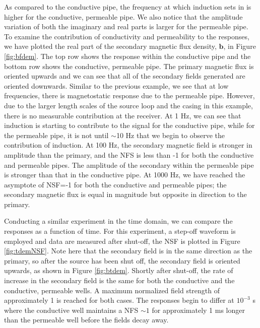 As compared to the conductive pipe, the frequency at which induction sets in is higher for the conductive, permeable pipe. We also notice that the amplitude variation of both the imaginary and real parts is larger for the permeable pipe. To examine the contribution of conductivity and permeability to the responses, we have plotted the real part of the secondary magnetic flux density, $\mathbf{b}$, in Figure \ref{fig:bfdem}. The top row shows the response within the conductive pipe and the bottom row shows the conductive, permeable pipe. The primary magnetic flux is oriented upwards and we can see that all of the secondary fields generated are oriented downwards. Similar to the previous example, we see that at low frequencies, there is magnetostatic response due to the permeable pipe. However, due to the larger length scales of the source loop and the casing in this example, there is no measurable contribution at the receiver. At 1 Hz, we can see that induction is starting to contribute to the signal for the conductive pipe, while for the permeable pipe, it is not until $\sim$10 Hz that we begin to observe the contribution of induction. At 100 Hz, the secondary magnetic field is stronger in amplitude than the primary, and the NFS is less than -1 for both the conductive and permeable pipes. The amplitude of the secondary within the permeable pipe is stronger than that in the conductive pipe. At 1000 Hz, we have reached the asymptote of NSF=-1 for both the conductive and permeable pipes; the secondary magnetic flux is equal in magnitude but opposite in direction to the primary.







Conducting a similar experiment in the time domain, we can compare the responses as a function of time. For this experiment, a step-off waveform is employed and data are measured after shut-off, the NSF is plotted in Figure \ref{fig:tdemNSF}. Note here that the secondary field is in the same direction as the primary, so after the source has been shut off, the secondary field is oriented upwards, as shown in Figure \ref{fig:btdem}. Shortly after shut-off, the rate of increase in the secondary field is the same for both the conductive and the conductive, permeable wells. A maximum normalized field strength of approximately 1 is reached for both cases. The responses begin to differ at $10^{-3}$ s where the conductive well maintains a NFS $\sim 1$ for approximately 1 ms longer than the permeable well before the fields decay away.


